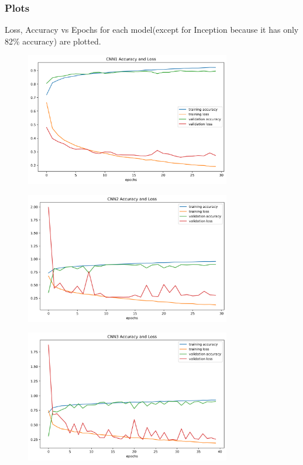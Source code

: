 \documentclass[12pt]{article}
\begin{document}
\subsubsection{Plots}
Loss, Accuracy vs Epochs for each model(except for Inception because it has only 82\% accuracy) are plotted.
\begin{figure}[H]
\begin{center}
    \includegraphics[width=0.8\textwidth]{../plots/CNN1_Result.png}
\end{center}
\end{figure}
\begin{figure}[H]
\begin{center}
    \includegraphics[width=0.8\textwidth]{../plots/CNN2_Result.png}
\end{center}
\end{figure}
\begin{figure}[H]
\begin{center}
    \includegraphics[width=0.8\textwidth]{../plots/CNN3_Result.png}
\end{center}
\end{figure}
\end{document}
